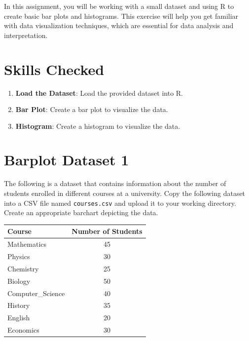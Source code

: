 \documentclass[
  letterpaper,
  DIV=11,
  numbers=noendperiod]{scrreprt}
\providecommand{\tightlist}{%
  \setlength{\itemsep}{0pt}\setlength{\parskip}{0pt}}\usepackage{longtable,booktabs,array}
\begin{document}

In this assignment, you will be working with a small dataset and using R
to create basic bar plots and histograms. This exercise will help you
get familiar with data visualization techniques, which are essential for
data analysis and interpretation.

\section*{Skills Checked}\label{skills-checked}


\begin{enumerate}
\def\labelenumi{\arabic{enumi}.}
\tightlist
\item
  \textbf{Load the Dataset}: Load the provided dataset into R.
\item
  \textbf{Bar Plot}: Create a bar plot to visualize the data.
\item
  \textbf{Histogram}: Create a histogram to visualize the data.
\end{enumerate}

\section*{Barplot Dataset 1}\label{barplot-dataset-1}


The following is a dataset that contains information about the number of
students enrolled in different courses at a university. Copy the
following dataset into a CSV file named \texttt{courses.csv} and upload
it to your working directory. Create an appropriate barchart depicting
the data.

\begin{longtable}[]{@{}lc@{}}
\toprule\noalign{}
Course & Number of Students \\
\midrule\noalign{}
\endhead
\bottomrule\noalign{}
\endlastfoot
Mathematics & 45 \\
Physics & 30 \\
Chemistry & 25 \\
Biology & 50 \\
Computer\_Science & 40 \\
History & 35 \\
English & 20 \\
Economics & 30 \\
\end{longtable}
\end{document}
